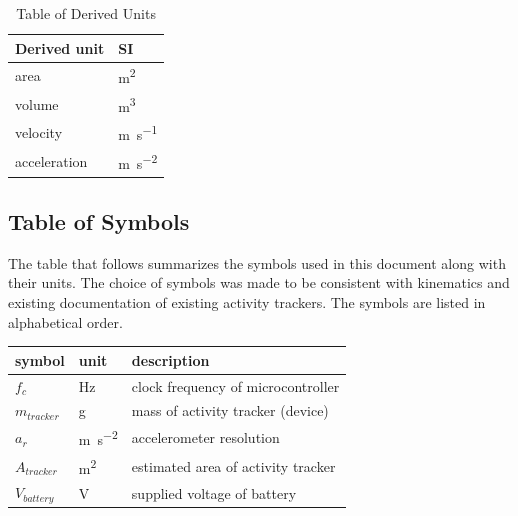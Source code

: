\documentclass[12pt]{article}
\begin{document}
  \renewcommand{\arraystretch}{1.2}
\begin{table}[H]
	\caption{\label{devUnit}Table of Derived Units}  
	 \noindent \begin{tabular}{l l} 
	    \toprule		
	    \textbf{Derived unit} & \textbf{SI}\\
	    \midrule 
	    area  & \si{\square\metre}\\
	    volume & \si{\cubic\metre}\\
	    velocity &  \si{\metre\per\second}\\
	    acceleration &  \si{\metre\per\square\second}\\    
	    \bottomrule
	  \end{tabular}

\end{table}

\subsection{Table of Symbols}

The table that follows summarizes the symbols used in this document along with
their units.  The choice of symbols was made to be consistent with kinematics and existing documentation of existing activity trackers. The symbols are listed in alphabetical order.

\renewcommand{\arraystretch}{1.2}

\begin{table}[H]
	\caption{\label{symb}Table of Symbols}  
	\noindent\begin{longtable*}{l l p{12cm}} \toprule
	\textbf{symbol} & \textbf{unit} & \textbf{description}\\
	\midrule
	$f_c$ & \si{\Hz} & clock frequency of microcontroller\\
	$m_{tracker}$ & \si\g & mass of activity tracker (device)\\
	$a_r$ & \si{\metre\per\square\second} & accelerometer resolution\\
	$A_{tracker}$ & \si[per-mode=symbol] {\square\metre} & estimated area of activity tracker\\
	$V_{battery}$ & \si\V & supplied voltage of battery\\
	\bottomrule
	\end{longtable*}
\end{table}
\end{document}
